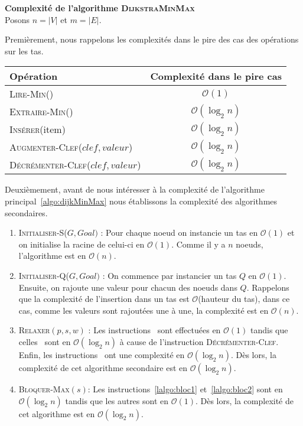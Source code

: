 \noindent\textbf{Complexité de l'algorithme \textsc{DijkstraMinMax}}\\

Posons $n = |V|$ et $ m = |E|$.

Premièrement, nous rappelons les complexités dans le pire des cas des opérations sur les tas.

\begin{center}
	\begin{tabular}{|l|c|}
		\hline
		Opération & Complexité dans le pire cas \\
		\hline
		\hline
		\textsc{Lire-Min()} & $\mathcal{O}(1)$\\
		\hline
		\textsc{Extraire-Min()} & $\mathcal{O}(\log_2 n)$\\
		\hline
		\textsc{Insérer}(item) & $\mathcal{O}(\log_2 n)$\\
		\hline
		\textsc{Augmenter-Clef}($clef,valeur$) & $\mathcal{O}(\log_2 n)$\\
		\hline
		\textsc{Décrémenter-Clef}($clef,valeur$) & $\mathcal{O}(\log_2 n)$\\
		\hline
		
	\end{tabular}
\end{center}

Deuxièmement, avant de nous intéresser à la complexité de l'algorithme principal~\ref{algo:dijkMinMax} nous établissons la complexité des algorithmes secondaires.

\begin{enumerate}
	\item \textsc{Initialiser-S}($G,Goal)$ : Pour chaque noeud on instancie un tas en $\mathcal{O}(1)$ et on initialise la racine de celui-ci en $\mathcal{O}(1)$. Comme il y a $n$ noeuds, l'algorithme est en $\mathcal{O}(n)$.
	
	\item \textsc{Initialiser-Q}($G,Goal)$ : On  commence par instancier un tas $Q$ en $\mathcal{O}(1)$. Ensuite, on rajoute une valeur pour chacun des noeuds dans $Q$. Rappelons que la complexité de l'insertion dans un tas est $\mathcal{O}$(hauteur du tas), dans ce cas, comme les valeurs sont rajoutées une à une, la complexité est en $\mathcal{O}(n)$.
	
	\item \textsc{Relaxer}$(p, s, w)$ : Les instructions~ sont effectuées en $\mathcal{O}(1)$ tandis que celles~ sont en $\mathcal{O}(\log_2 n)$ à cause de l'instruction \textsc{Décrémenter-Clef}. Enfin, les instructions~ ont une complexité en $\mathcal{O}(\log_2 n)$. Dès lors, la complexité de cet algorithme secondaire est en $\mathcal{O}(\log_2 n)$.
	
	 \item \textsc {Bloquer-Max}$(s)$: Les instructions~\ref{lalgo:bloc1} et~\ref{lalgo:bloc2} sont en $\mathcal{O}(\log_2 n)$ tandis que les autres sont en $\mathcal{O}(1)$. Dès lors, la complexité de cet algorithme est en $\mathcal{O}(\log_2 n)$.
	
	
\end{enumerate}

